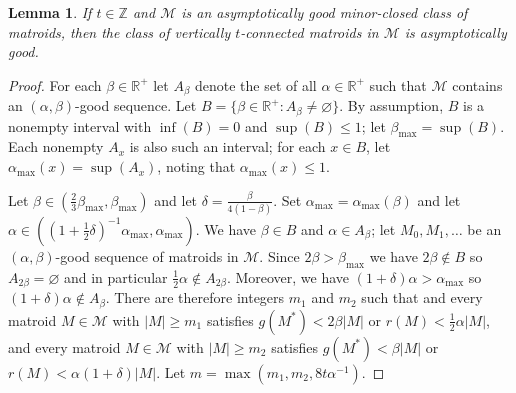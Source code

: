 \documentclass[12pt]{amsart}
\newtheorem{lemma}[theorem]{Lemma}
\theoremstyle{definition}
\newcommand{\bR}{\mathbb R}
\newcommand{\bZ}{\mathbb Z}
\newcommand{\cM}{\mathcal{M}}
\begin{document}
\begin{lemma}\label{connreduction}
  If $t \in \bZ$ and $\cM$ is an asymptotically good minor-closed class of matroids, then the class of vertically $t$-connected matroids in $\cM$ is asymptotically good. 
\end{lemma}
\begin{proof}
  For each $\beta \in \bR^+$ let $A_{\beta}$ denote the set of all $\alpha \in \bR^+$ such that $\cM$ contains an $(\alpha,\beta)$-good sequence.
  Let $B = \{\beta \in \bR^+: A_\beta \ne \varnothing\}$. By assumption, $B$ is a nonempty interval with $\inf(B) = 0$ and $\sup(B) \le 1$; let $\beta_{\max} = \sup(B)$. Each nonempty $A_x$ is also such an interval; for each $x \in B$, let $\alpha_{\max}(x) = \sup(A_x)$, noting that $\alpha_{\max}(x) \le 1$. 
  
  Let $\beta \in (\tfrac{2}{3}\beta_{\max},\beta_{\max})$ and let $\delta = \tfrac{\beta}{4(1-\beta)}$. Set $\alpha_{\max} = \alpha_{\max}(\beta)$ and let $\alpha \in ((1+\tfrac{1}{2}\delta)^{-1}\alpha_{\max},\alpha_{\max})$. We have $\beta \in B$ and $\alpha \in A_{\beta}$; let $M_0, M_1, \dotsc$ be an $(\alpha,\beta)$-good sequence of matroids in $\cM$. Since $2\beta > \beta_{\max}$ we have $2\beta \notin B$ so $A_{2\beta} = \varnothing$ and in particular $\tfrac{1}{2}\alpha \notin A_{2\beta}$. Moreover, we have $(1+\delta)\alpha > \alpha_{\max}$ so $(1+\delta)\alpha \notin A_\beta$. There are therefore integers $m_1$ and $m_2$ such that and every matroid $M \in \cM$ with $|M| \ge m_1$ satisfies $g(M^*) < 2\beta |M|$ or $r(M) < \tfrac{1}{2}\alpha|M|$, and every matroid $M \in \cM$ with $|M| \ge m_2$ satisfies $g(M^*) < \beta |M|$ or $r(M) < \alpha(1+\delta)|M|$. Let $m = \max(m_1,m_2,8t\alpha^{-1})$. 
  

\end{proof}
\end{document}

